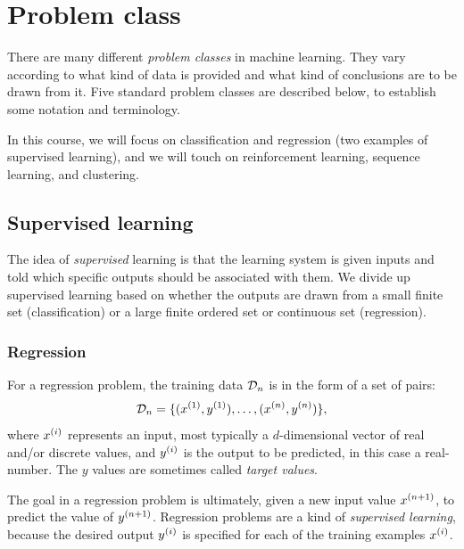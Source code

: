 \section{Problem class}

There are many different {\em problem classes} in machine learning.
They vary according to what kind of data is provided and what kind of
conclusions are to be drawn from it.  %
Five standard problem classes are described below, to establish some notation and
terminology.

In this course, we will focus on classification and regression (two
examples of supervised learning), and we will touch on reinforcement
learning, sequence learning, and clustering.

\subsection{Supervised learning}

The idea of {\em supervised} learning is that the learning system is
given inputs and told which specific outputs should be associated with
them.  We divide up supervised learning based on whether the outputs
are drawn from a small finite set (classification) or a large finite
ordered set or continuous set (regression).

\subsubsection{Regression}

For a regression problem, the training data ${\cal D}_n$ is in the form of a set of pairs:
\[{\cal D}_n = \{(x^{(1)},
  y^{(1)}), \ldots, (x^{(n)}, y^{(n)})\},\]
where $x^{(i)}$
represents an input, most typically a
$d$-dimensional vector of real and/or discrete values, and
$y^{(i)}$ is the output to be predicted, in this case a real-number.
  The $y$ values are sometimes
called {\em target values}.

The goal in a regression problem is ultimately, given a new input
value $x^{(n+1)}$, to predict the value of $y^{(n+1)}$.
Regression problems are a kind of {\em supervised learning},
because the desired output $y^{(i)}$ is specified for
each of the training examples $x^{(i)}$.

